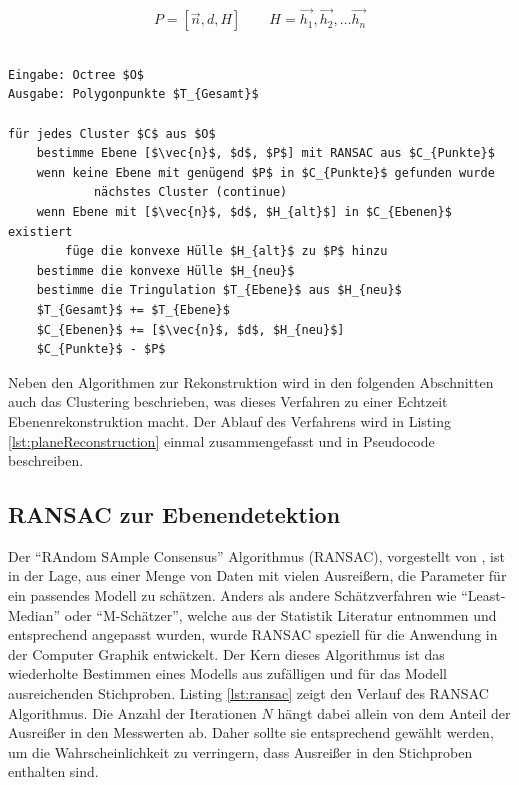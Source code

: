 \begin{equation} \label{eq:plane}
P=\left[\vec{n}, d, H\right] \qquad H=\vec{h_1}, \vec{h_2}, \ldots  \vec{h_n}
\end{equation}

\begin{lstlisting}[mathescape,caption=Planaren Echtzeit Rekonstruktion, label=lst:planeReconstruction]

Eingabe: Octree $O$
Ausgabe: Polygonpunkte $T_{Gesamt}$

für jedes Cluster $C$ aus $O$
    bestimme Ebene [$\vec{n}$, $d$, $P$] mit RANSAC aus $C_{Punkte}$
    wenn keine Ebene mit genügend $P$ in $C_{Punkte}$ gefunden wurde
    		nächstes Cluster (continue)
    wenn Ebene mit [$\vec{n}$, $d$, $H_{alt}$] in $C_{Ebenen}$ existiert	
        füge die konvexe Hülle $H_{alt}$ zu $P$ hinzu	
    bestimme die konvexe Hülle $H_{neu}$
    bestimme die Tringulation $T_{Ebene}$ aus $H_{neu}$
    $T_{Gesamt}$ += $T_{Ebene}$
    $C_{Ebenen}$ += [$\vec{n}$, $d$, $H_{neu}$]
    $C_{Punkte}$ - $P$
\end{lstlisting}

Neben den Algorithmen zur Rekonstruktion wird in den folgenden Abschnitten auch das Clustering beschrieben, was dieses Verfahren zu einer Echtzeit Ebenenrekonstruktion macht. Der Ablauf des Verfahrens wird in Listing \ref{lst:planeReconstruction} einmal zusammengefasst und in Pseudocode beschreiben.

\subsection{RANSAC zur Ebenendetektion} \label{sec:ransac}

Der \enquote{RAndom SAmple Consensus} Algorithmus (RANSAC), vorgestellt von \citet{fischler1981random}, ist in der Lage, aus einer Menge von Daten mit vielen Ausreißern, die Parameter für ein passendes Modell zu schätzen. Anders als andere Schätzverfahren wie \enquote{Least-Median} oder \enquote{M-Schätzer}, welche aus der Statistik Literatur entnommen und entsprechend angepasst wurden, wurde RANSAC speziell für die Anwendung in der Computer Graphik entwickelt. Der Kern dieses Algorithmus ist das wiederholte Bestimmen eines Modells aus zufälligen und für das Modell ausreichenden Stichproben. Listing \ref{lst:ransac} zeigt den Verlauf des RANSAC Algorithmus. Die Anzahl der Iterationen \(N\) hängt dabei allein von dem Anteil der Ausreißer in den Messwerten ab. Daher sollte sie entsprechend gewählt werden, um die Wahrscheinlichkeit zu verringern, dass Ausreißer in den Stichproben enthalten sind. \citep{derpanis2010overview} \\


